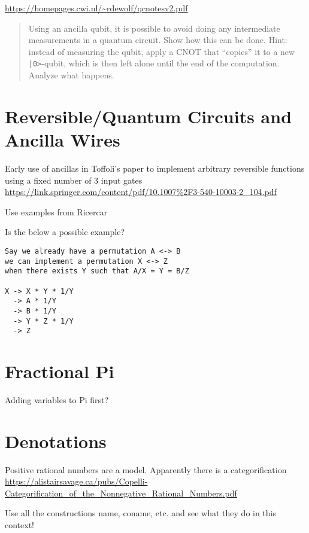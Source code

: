 \documentclass[sigplan,10pt,review,anonymous]{acmart}
\begin{document}
\url{https://homepages.cwi.nl/~rdewolf/qcnotesv2.pdf}
\begin{quote}
Using an ancilla qubit, it is possible to avoid doing any intermediate measurements in a quantum circuit. Show how this can be done.  Hint: instead of measuring the qubit, apply a CNOT that “copies” it to a new \verb.|0>.-qubit, which is then left alone until the end of the computation. Analyze what happens.
\end{quote}

\section{Reversible/Quantum Circuits and Ancilla Wires} 

Early use of ancillas in Toffoli's paper to implement arbitrary reversible functions using a fixed number of 3 input gates \url{https://link.springer.com/content/pdf/10.1007%2F3-540-10003-2_104.pdf}

Use examples from Ricercar

Is the below a possible example?
\begin{verbatim}
Say we already have a permutation A <-> B
we can implement a permutation X <-> Z 
when there exists Y such that A/X = Y = B/Z

X -> X * Y * 1/Y 
  -> A * 1/Y
  -> B * 1/Y
  -> Y * Z * 1/Y
  -> Z
\end{verbatim}

\section{Fractional Pi}

Adding variables to Pi first? 
 
\section{Denotations}
 
Positive rational numbers are a model. Apparently there is a categorification \url{https://alistairsavage.ca/pubs/Copelli-Categorification_of_the_Nonnegative_Rational_Numbers.pdf}

Use all the constructions name, coname, etc. and see what they do in this context!

\end{document}
